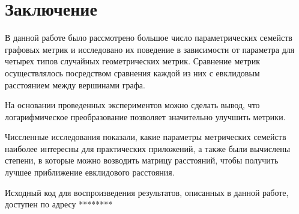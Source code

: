 \chapter*{Заключение}						%

В данной работе было рассмотрено большое число параметрических семейств графовых метрик и исследовано их поведение в зависимости от параметра для четырех типов случайных геометрических метрик. Сравнение метрик осуществлялось посредством сравнения каждой из них с евклидовым расстоянием между вершинами графа.

На основании проведенных экспериментов можно сделать вывод, что логарифмическое преобразование позволяет значительно улучшить метрики.

Чиссленные исследования показали, какие параметры метрических семейств наиболее интересны для практических приложений, а также были вычислены степени, в которые можно возводить матрицу расстояний, чтобы получить лучшее приближение евклидового расстояния.

Исходный код для воспроизведения результатов, описанных в данной работе, доступен по адресу ********

\clearpage